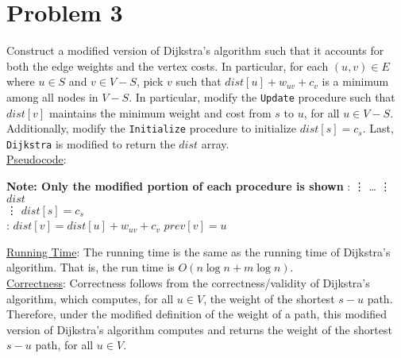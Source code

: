 \documentclass[twoside,11pt]{homework}
\newcommand\NoProc{\renewcommand\algorithmicprocedure{}}
\begin{document}
\section*{Problem 3}
Construct a modified version of Dijkstra's algorithm such that it accounts for both the edge weights and the vertex costs.  In particular,  for each $(u, v) \in E$ where $u \in S$ and $v \in V - S$,  pick $v$ such that $dist[u] + w_{uv} + c_v$ is a minimum among all nodes in $V-S$.  In particular,  modify the \texttt{Update} procedure such that $dist[v]$ maintains the minimum weight and cost from $s$ to $u$, for all $u \in V-S$.  Additionally,  modify the \texttt{Initialize} procedure to initialize $dist[s] = c_s$.  Last,  \texttt{Dijkstra} is modified to return the $dist$ array.\\


\noindent
\underline{Pseudocode}:
\begin{algorithm}
\begin{algorithmic}[1]
\State \textbf{\color{red} Note: Only the modified portion of each procedure is shown}
\NoProc
{}:  
\State {}
\State \vdots
\State \dots {}
\State \vdots
\State \Return $dist$
\EndProcedure \\

\State \vdots
\State $dist[s] = c_s$
\EndProcedure \\

:
\State $dist[v] = dist[u] + w_{uv} + c_v$
\State $prev[v] = u$
\EndIf
\EndProcedure
\end{algorithmic}
\end{algorithm}


\noindent
\underline{Running Time}:   The running time is the same as the running time of Dijkstra's algorithm. That is, the run time is $O(n \log n + m \log n)$.  \\

\noindent
\underline{Correctness}:   Correctness follows from the correctness/validity of Dijkstra's algorithm, which computes, for all $u \in V$,  the weight of the shortest $s-u$ path.  Therefore, under the modified definition of the weight of a path, this modified version of  Dijkstra's algorithm computes and returns the weight of the shortest $s-u$ path, for all $u \in V$.
\end{document}
